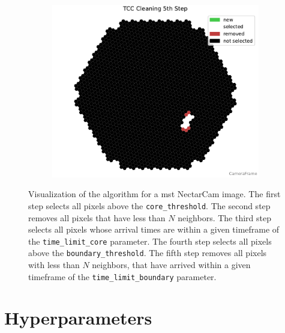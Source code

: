 \begin{figure}
\begin{subfigure}[]{0.32\textwidth}
        \includegraphics[width=\textwidth]{plots/cleaner_steps/tcc_5.pdf}
    \end{subfigure}
    \caption{Visualization of the \tcc{} algorithm for a \gls{mst} NectarCam image. The first step
    selects all pixels above the \texttt{core\_threshold}. The second step removes all pixels that have less than
    \(N\) neighbors. The third step selects all pixels whose arrival times are within a given timeframe of the
    \texttt{time\_limit\_core} parameter. The fourth step selects all pixels above the \texttt{boundary\_threshold}.
    The fifth step removes all pixels with less than \(N\) neighbors, that have arrived within a given timeframe
    of the \texttt{time\_limit\_boundary} parameter.}
    \label{fig:tcc_cleaning}
\end{figure}

\section{Hyperparameters}
\label{sec:hyperparameters}

